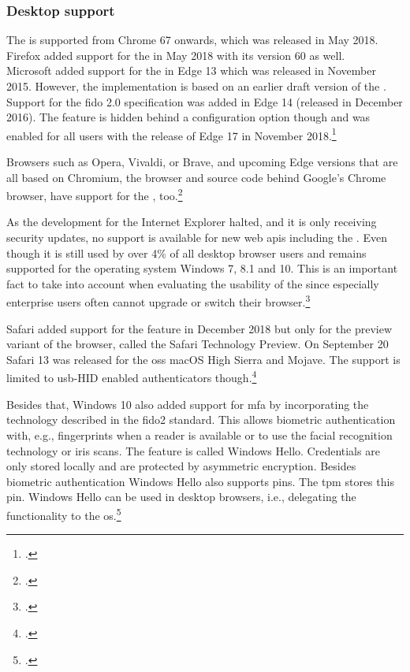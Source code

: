 \subsubsection{Desktop support}

The \wa{} is supported from Chrome 67 onwards, which was released in May 2018. Firefox added support for the \wa{} in May 2018 with its version 60 as well.\\
Microsoft added support for the \wa{} in Edge 13 which was released in November 2015. However, the implementation is based on an earlier draft version of the \wa. Support for the \gls{fido} 2.0 specification was added in Edge 14 (released in December 2016). The feature is hidden behind a configuration option though and was enabled for all users with the release of Edge 17 in November 2018.\footcite[See][112]{Jacobs:2019}

Browsers such as Opera, Vivaldi, or Brave, and upcoming Edge versions that are all based on Chromium, the browser and source code behind Google's Chrome browser, have support for the \wa, too.\footcites[See][Chapter 7.1]{kissell2019take}

As the development for the Internet Explorer halted, and it is only receiving security updates, no support is available for new web \glspl{api} including the \wa. Even though it is still used by over 4\% of all desktop browser users and remains supported for the operating system Windows 7, 8.1 and 10. This is an important fact to take into account when evaluating the usability of the \wa{} since especially enterprise users often cannot upgrade or switch their browser.\footcites[See][]{ie-support}[See][]{statcounter-desktop}

Safari added support for the \wa{} feature in December 2018 but only for the preview variant of the browser, called the Safari Technology Preview. On September 20 Safari 13 was released for the \glspl{os} macOS High Sierra and Mojave. The support is limited to \gls{usb}-HID enabled authenticators though.\footcites[See][]{safari-webauthn}[See][]{safari-13-release}

Besides that, Windows 10 also added support for \gls{mfa} by incorporating the technology described in the \gls{fido}2 standard. This allows biometric authentication with, e.g., fingerprints when a reader is available or to use the facial recognition technology or iris scans. The feature is called \frqq Windows Hello\flqq{}. Credentials are only stored locally and are protected by asymmetric encryption. Besides biometric authentication Windows Hello also supports \glspl{pin}. The \gls{tpm} stores this \gls{pin}. Windows Hello can be used in desktop browsers, i.e., delegating the \wa{} functionality to the \gls{os}.\footcites[See][]{201612}[See][6]{fido-whitepaper-amd}

